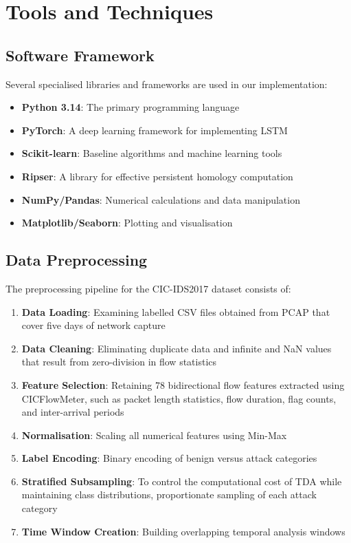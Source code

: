 \documentclass[conference]{IEEEtran}
\begin{document}
\section{Tools and Techniques}

\subsection{Software Framework}

Several specialised libraries and frameworks are used in our implementation:

\begin{itemize}
\item \textbf{Python 3.14}: The primary programming language
\item \textbf{PyTorch}: A deep learning framework for implementing LSTM
\item \textbf{Scikit-learn}: Baseline algorithms and machine learning tools
\item \textbf{Ripser}: A library for effective persistent homology computation
\item \textbf{NumPy/Pandas}: Numerical calculations and data manipulation
\item \textbf{Matplotlib/Seaborn}: Plotting and visualisation
\end{itemize}

\subsection{Data Preprocessing}

The preprocessing pipeline for the CIC-IDS2017 dataset consists of:

\begin{enumerate}
\item \textbf{Data Loading}: Examining labelled CSV files obtained from PCAP that cover five days of network capture
\item \textbf{Data Cleaning}: Eliminating duplicate data and infinite and NaN values that result from zero-division in flow statistics
\item \textbf{Feature Selection}: Retaining 78 bidirectional flow features extracted using CICFlowMeter, such as packet length statistics, flow duration, flag counts, and inter-arrival periods
\item \textbf{Normalisation}: Scaling all numerical features using Min-Max
\item \textbf{Label Encoding}: Binary encoding of benign versus attack categories
\item \textbf{Stratified Subsampling}: To control the computational cost of TDA while maintaining class distributions, proportionate sampling of each attack category
\item \textbf{Time Window Creation}: Building overlapping temporal analysis windows
\end{enumerate}
\end{document}
